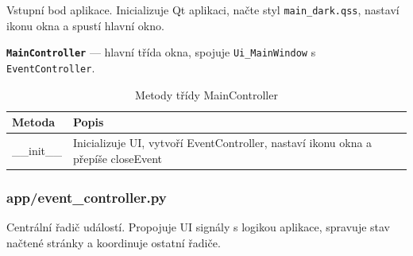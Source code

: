 \documentclass[FM,Proj]{tulthesis}
\begin{document}
Vstupní bod aplikace. Inicializuje Qt aplikaci, načte styl \texttt{main\_dark.qss},
nastaví ikonu okna a spustí hlavní okno.

\textbf{\texttt{MainController}} — hlavní třída okna, spojuje \texttt{Ui\_MainWindow}
s \texttt{EventController}.

\begin{table}[H]
	\centering
	\caption{Metody třídy MainController}
	\begin{tabularx}{\textwidth}{|l|X|}
		\hline
		\textbf{Metoda} & \textbf{Popis} \\ \hline
		\_\_init\_\_ & Inicializuje UI, vytvoří EventController, nastaví ikonu okna a přepíše closeEvent \\ \hline
	\end{tabularx}
	\label{tab:maincontroller}
\end{table}


\subsubsection{app/event\_controller.py}

Centrální řadič událostí. Propojuje UI signály s logikou aplikace, spravuje
stav načtené stránky a koordinuje ostatní řadiče.
\end{document}
